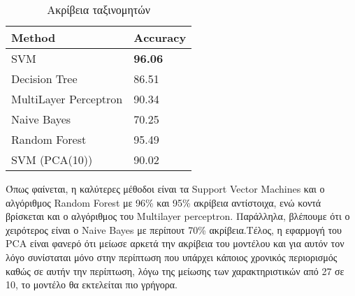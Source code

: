 \begin{table}[H]
\begin{tabular}{|l|l|}
\hline
\textbf{Method}             & \textbf{Αccuracy}\\\hline
SVM                         & \textbf{96.06}   \\\hline
Decision Tree               & 86.51 \\\hline
MultiLayer Perceptron       & 90.34 \\\hline
Naive Bayes                 & 70.25 \\\hline 
Random Forest               & 95.49 \\\hline
SVM (PCA(10))               & 90.02 \\\hline
\end{tabular}
\caption{Ακρίβεια ταξινομητών}
\end{table}

Όπως φαίνεται, η καλύτερες μέθοδοι είναι τα Support Vector Machines και ο αλγόριθμος Random Forest με 96\% και 95\% ακρίβεια αντίστοιχα, ενώ  κοντά βρίσκεται και ο αλγόριθμος του Multilayer perceptron. Παράλληλα, βλέπουμε ότι ο χειρότερος είναι ο Naive Bayes με περίπουτ 70\% ακρίβεια.Τέλος, η εφαρμογή του PCA είναι φανερό ότι μείωσε αρκετά την ακρίβεια του μοντέλου και για αυτόν τον λόγο συνίσταται μόνο στην περίπτωση που υπάρχει κάποιος χρονικός περιορισμός καθώς σε αυτήν την περίπτωση, λόγω της μείωσης των χαρακτηριστικών από 27 σε 10, το μοντέλο θα εκτελείται πιο γρήγορα.  


